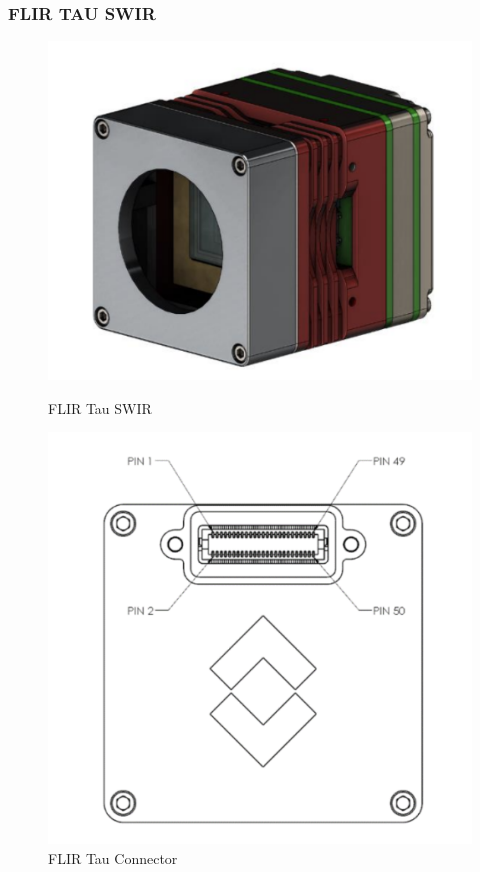 \documentclass[12pt,a4paper]{article}
\begin{document}
    \subsubsection{FLIR TAU SWIR}
    \begin{figure}[H]
        \centering
            \begin{minipage}{0.49\linewidth}
            \centering
            \includegraphics[width=1\textwidth]{../figures/tau_ss.png}
            \caption{\centering FLIR Tau SWIR}
            \label{fig:tau_swir}
        \end{minipage}
        \begin{minipage}{0.4\linewidth}
            \centering
            \includegraphics[width=1\textwidth]{../figures/tau_conn_ss.png}
            \caption{\centering FLIR Tau Connector}
            \label{fig:tau_conn}
        \end{minipage}
    \end{figure}
\end{document}
